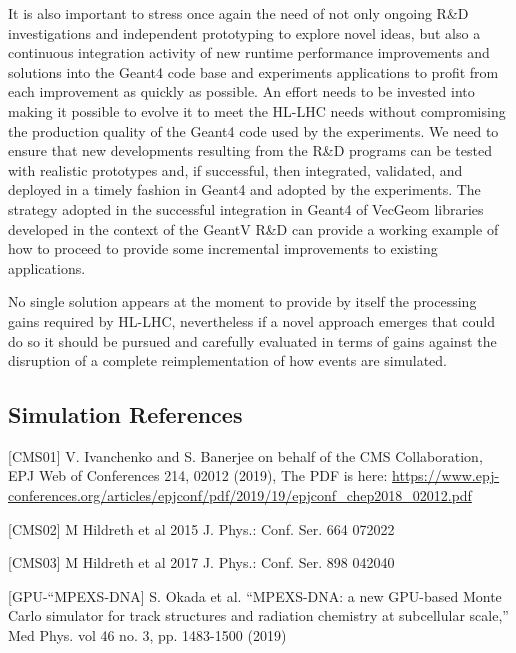 \documentclass[10pt,a4paper]{article}
\begin{document}
It is also important to stress once again the need of not only ongoing
R\&D investigations and independent prototyping to explore novel ideas,
but also a continuous integration activity of new runtime performance
improvements and solutions into the Geant4 code base and experiments
applications to profit from each improvement as quickly as possible. An
effort needs to be invested into making it possible to evolve it to meet
the HL-LHC needs without compromising the production quality of the
Geant4 code used by the experiments. We need to ensure that new
developments resulting from the R\&D programs can be tested with
realistic prototypes and, if successful, then integrated, validated, and
deployed in a timely fashion in Geant4 and adopted by the experiments.
The strategy adopted in the successful integration in Geant4 of VecGeom
libraries developed in the context of the GeantV R\&D can provide a
working example of how to proceed to provide some incremental
improvements to existing applications.

No single solution appears at the moment to provide by itself the
processing gains required by HL-LHC, nevertheless if a novel approach
emerges that could do so it should be pursued and carefully evaluated in
terms of gains against the disruption of a complete reimplementation of
how events are simulated.

\subsection{Simulation References}\label{references-1}


{[}CMS01{]} V. Ivanchenko and S. Banerjee on behalf of the CMS
Collaboration, EPJ Web of Conferences 214, 02012 (2019), The PDF is
here:
\url{https://www.epj-conferences.org/articles/epjconf/pdf/2019/19/epjconf_chep2018_02012.pdf}

{[}CMS02{]} M Hildreth et al 2015 J. Phys.: Conf. Ser. 664 072022

{[}CMS03{]} M Hildreth et al 2017 J. Phys.: Conf. Ser. 898 042040

{[}GPU-``MPEXS-DNA{]} S. Okada et al. ``MPEXS-DNA: a new GPU-based Monte
Carlo simulator for track structures and radiation chemistry at
subcellular scale,'' Med Phys. vol 46 no. 3, pp. 1483-1500 (2019)
\end{document}
